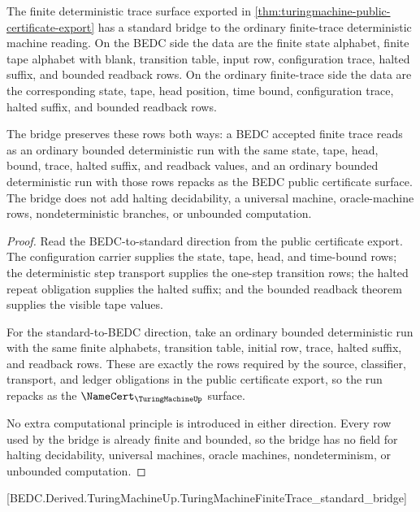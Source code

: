 \begin{theorem}
\label{thm:turingmachine-finite-trace-standard-bridge}
The finite deterministic trace surface exported in
\autoref{thm:turingmachine-public-certificate-export} has a standard bridge to
the ordinary finite-trace deterministic machine reading. On the BEDC side the
data are the finite state alphabet, finite tape alphabet with blank, transition
table, input row, configuration trace, halted suffix, and bounded readback
rows. On the ordinary finite-trace side the data are the corresponding state,
tape, head position, time bound, configuration trace, halted suffix, and
bounded readback rows.

The bridge preserves these rows both ways: a BEDC accepted finite trace reads
as an ordinary bounded deterministic run with the same state, tape, head,
bound, trace, halted suffix, and readback values, and an ordinary bounded
deterministic run with those rows repacks as the BEDC public certificate
surface. The bridge does not add halting decidability, a universal machine,
oracle-machine rows, nondeterministic branches, or unbounded computation.
\end{theorem}
\begin{proof}
Read the BEDC-to-standard direction from the public certificate export. The
configuration carrier supplies the state, tape, head, and time-bound rows; the
deterministic step transport supplies the one-step transition rows; the halted
repeat obligation supplies the halted suffix; and the bounded readback theorem
supplies the visible tape values.

For the standard-to-BEDC direction, take an ordinary bounded deterministic run
with the same finite alphabets, transition table, initial row, trace, halted
suffix, and readback rows. These are exactly the rows required by the source,
classifier, transport, and ledger obligations in the public certificate export,
so the run repacks as the $\NameCert_{\TuringMachineUp}$ surface.

No extra computational principle is introduced in either direction. Every row
used by the bridge is already finite and bounded, so the bridge has no field
for halting decidability, universal machines, oracle machines, nondeterminism,
or unbounded computation.
\end{proof}

[BEDC.Derived.TuringMachineUp.TuringMachineFiniteTrace\_standard\_bridge]

